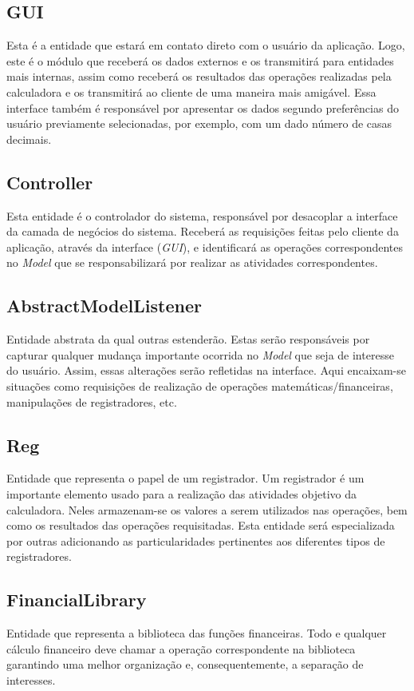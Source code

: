 \subsection{GUI}
Esta é a entidade que estará em contato direto com o usuário da aplicação. Logo, este é o módulo que receberá os dados externos e os transmitirá para entidades mais internas, assim como receberá os resultados das operações realizadas pela calculadora e os transmitirá ao cliente de uma maneira mais amigável. Essa interface também é responsável por apresentar os dados segundo preferências do usuário previamente selecionadas, por exemplo, com um dado número de casas decimais.

\subsection{Controller}
Esta entidade é o controlador do sistema, responsável por desacoplar a interface da camada de negócios do sistema. Receberá as requisições feitas pelo cliente da aplicação, através da interface (\textit{GUI}), e identificará as operações correspondentes no \textit{Model} que se responsabilizará por realizar as atividades correspondentes.

\subsection{AbstractModelListener}
Entidade abstrata da qual outras estenderão. Estas serão responsáveis por capturar qualquer mudança importante ocorrida no \textit{Model} que seja de interesse do usuário. Assim, essas alterações serão refletidas na interface. Aqui encaixam-se situações como requisições de realização de operações matemáticas/financeiras, manipulações de registradores, etc.

\subsection{Reg}
Entidade que representa o papel de um registrador. Um registrador é um importante elemento usado para a realização das atividades objetivo da calculadora. Neles armazenam-se os valores a serem utilizados nas operações, bem como os resultados das operações requisitadas. Esta entidade será especializada por outras adicionando as particularidades pertinentes aos diferentes tipos de registradores.

\subsection{FinancialLibrary}
Entidade que representa a biblioteca das funções financeiras. Todo e qualquer cálculo financeiro deve chamar a operação correspondente na biblioteca garantindo uma melhor organização e, consequentemente, a separação de interesses.

